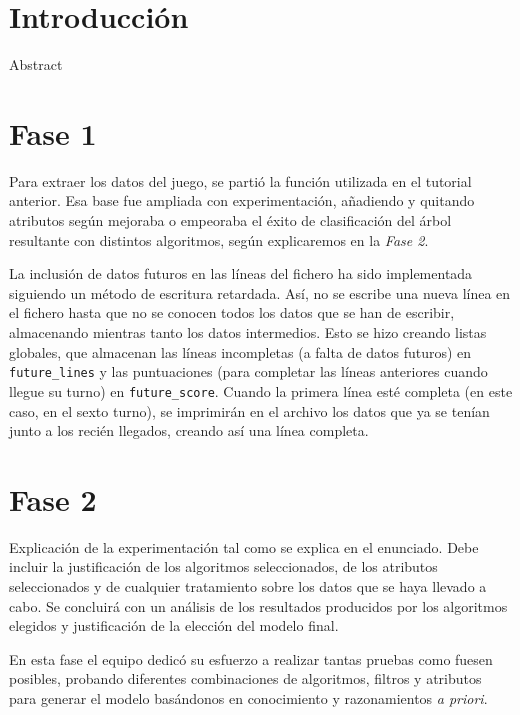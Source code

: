 \documentclass[12pt]{article}
\begin{document}
\tableofcontents

\newpage
\section*{Introducción}

\huge Abstract \small

\newpage
\section{Fase 1}

Para extraer los datos del juego, se partió la función utilizada en el tutorial anterior. Esa base fue ampliada con experimentación, añadiendo y quitando atributos según mejoraba o empeoraba el éxito de clasificación del árbol resultante con distintos algoritmos, según explicaremos en la \emph{Fase 2}.

La inclusión de datos futuros en las líneas del fichero ha sido implementada siguiendo un método de escritura retardada. Así, no se escribe una nueva línea en el fichero hasta que no se conocen todos los datos que se han de escribir, almacenando mientras tanto los datos intermedios. Esto se hizo creando listas globales, que almacenan las líneas incompletas (a falta de datos futuros) en \texttt{future\_lines} y las puntuaciones (para completar las líneas anteriores cuando llegue su turno) en \texttt{future\_score}. Cuando la primera línea esté completa (en este caso, en el sexto turno), se imprimirán en el archivo los datos que ya se tenían junto a los recién llegados, creando así una línea completa.

\newpage
\section{Fase 2}

Explicación de la experimentación tal como se explica en el enunciado. Debe incluir la justificación de los algoritmos seleccionados, de los atributos seleccionados y de cualquier tratamiento sobre los datos que se haya llevado a cabo. Se concluirá con un análisis de los resultados producidos por los algoritmos elegidos y justificación de la elección del modelo final.

En esta fase el equipo dedicó su esfuerzo a realizar tantas pruebas como fuesen posibles, probando diferentes combinaciones de algoritmos, filtros y atributos para generar el modelo basándonos en conocimiento y razonamientos \emph{a priori}.
\end{document}

